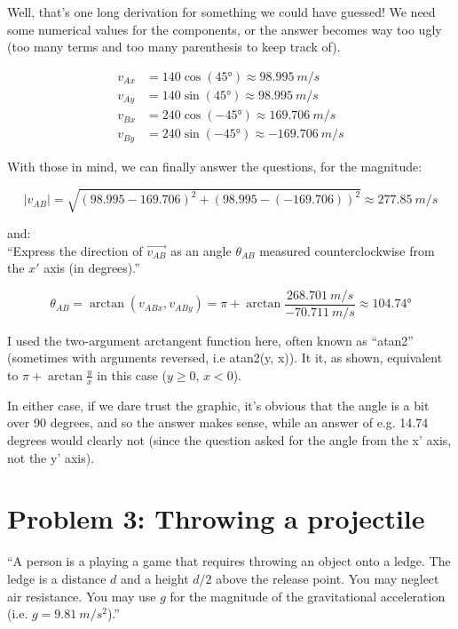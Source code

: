 \documentclass[12pt,a4paper]{report}
\begin{document}
Well, that's one long derivation for something we could have guessed! We need some numerical values for the components, or the answer becomes way too ugly (too many terms and too many parenthesis to keep track of).

\begin{align}
v_{Ax} &= 140 \cos(\ang{45}) \approx \SI{98.995}{m/s}\\
v_{Ay} &= 140 \sin(\ang{45}) \approx \SI{98.995}{m/s}\\
v_{Bx} &= 240 \cos(-\ang{45}) \approx \SI{169.706}{m/s}\\
v_{By} &= 240 \sin(-\ang{45}) \approx \SI{-169.706}{m/s}
\end{align}

With those in mind, we can finally answer the questions, for the magnitude:

\begin{equation}
|v_{AB}| = \sqrt{(98.995 - 169.706)^2 + (98.995 - (-169.706))^2} \approx \SI{277.85}{m/s}
\end{equation}

and:\\
``Express the direction of $\vec{v_{AB}}$ as an angle $\theta_{AB}$ measured counterclockwise from the $x'$ axis (in degrees).''

\begin{equation}
\theta_{AB} = \arctan (v_{ABx}, v_{ABy}) = \pi + \arctan \frac{\SI{268.701}{m/s}}{\SI{-70.711}{m/s}} \approx \ang{104.74}
\end{equation}

I used the two-argument arctangent function here, often known as ``atan2'' (sometimes with arguments reversed, i.e atan2(y, x)). It it, as shown, equivalent to $\displaystyle \pi + \arctan \frac{y}{x}$ in this case ($y \geq 0$, $x < 0$).

In either case, if we dare trust the graphic, it's obvious that the angle is a bit over 90 degrees, and so the answer makes sense, while an answer of e.g. 14.74 degrees would clearly not (since the question asked for the angle from the x' axis, not the y' axis).

\section{Problem 3: Throwing a projectile}

``A person is a playing a game that requires throwing an object onto a ledge. The ledge is a distance $d$ and a height $d/2$ above the release point. You may neglect air resistance. You may use $g$ for the magnitude of the gravitational acceleration (i.e. $g = \SI{9.81}{m/s^2}$).''
\end{document}
